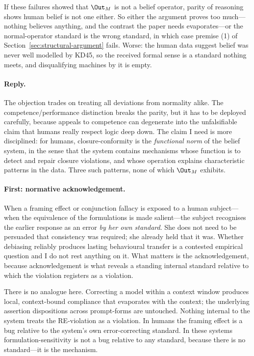 If these failures showed that $\Out_M$ is not a belief operator, parity of
reasoning shows human belief is not one either. So either the argument proves too
much---nothing believes anything, and the contrast the paper needs
evaporates---or the normal-operator standard is the wrong standard, in which case
premise (1) of Section~\ref{sec:structural-argument} fails. Worse: the human data
suggest belief was never well modelled by KD45, so the received formal sense is a
standard nothing meets, and disqualifying machines by it is empty.

\paragraph{Reply.} The objection trades on treating all deviations from normality
alike. The competence/performance distinction breaks the parity, but it has to be
deployed carefully, because appeals to competence can degenerate into the
unfalsifiable claim that humans really respect logic deep down. The claim I need
is more disciplined: for humans, closure-conformity is the \emph{functional norm}
of the belief system, in the sense that the system contains mechanisms whose
function is to detect and repair closure violations, and whose operation explains
characteristic patterns in the data. Three such patterns, none of which $\Out_M$
exhibits.

\paragraph{First: normative acknowledgement.} When a framing effect or
conjunction fallacy is exposed to a human subject---when the equivalence of the
formulations is made salient---the subject recognises the earlier response as an
error \emph{by her own standard}. She does not need to be persuaded that
consistency was required; she already held that it was. Whether debiasing
reliably produces lasting behavioural transfer is a contested empirical question
and I do not rest anything on it. What matters is the acknowledgement, because
acknowledgement is what reveals a standing internal standard relative to which
the violation registers as a violation.

There is no analogue here. Correcting a model within a context window produces
local, context-bound compliance that evaporates with the context; the underlying
assertion dispositions across prompt-forms are untouched. Nothing internal to the
system treats the RE-violation as a violation. In humans the framing effect is a
bug relative to the system's own error-correcting standard. In these systems
formulation-sensitivity is not a bug relative to any standard, because there is no
standard---it is the mechanism.

